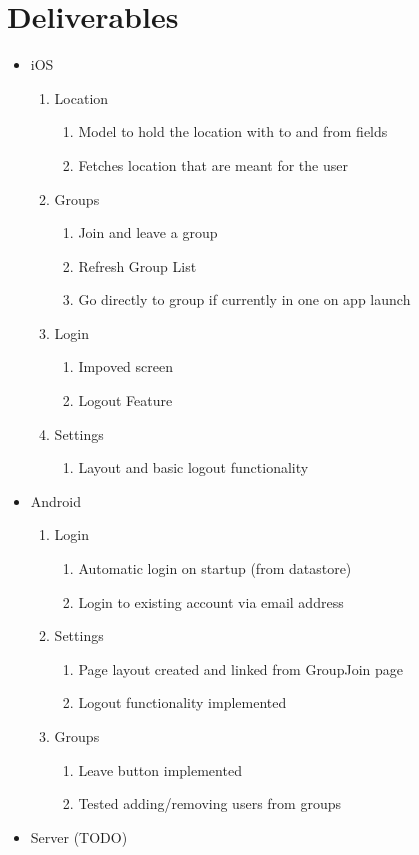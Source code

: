 \documentclass[11pt]{article}
\begin{document}
\section*{Deliverables}
	\begin{itemize}
	\item iOS
		\begin{enumerate}
		\item Location
			\begin{enumerate}
			\item Model to hold the location with to and from fields
			\item Fetches location that are meant for the user
			\end{enumerate}
		\item Groups
			\begin{enumerate}
			\item Join and leave a group
			\item Refresh Group List
			\item Go directly to group if currently in one on app launch
			\end{enumerate}
		\item Login
			\begin{enumerate}
			\item Impoved screen
			\item Logout Feature
			\end{enumerate}
		\item Settings
			\begin{enumerate}
			\item Layout and basic logout functionality
			\end{enumerate}
		\end{enumerate}
		
	\item Android
		\begin{enumerate}
		\item Login
			\begin{enumerate}
			\item Automatic login on startup (from datastore)
			\item Login to existing account via email address
			\end{enumerate}
		\item Settings
			\begin{enumerate}
			\item Page layout created and linked from GroupJoin page
			\item Logout functionality implemented
			\end{enumerate}
		\item Groups
			\begin{enumerate}
			\item Leave button implemented
			\item Tested adding/removing users from groups
			\end{enumerate}
		\end{enumerate}
	\item Server
		(TODO)


\end{itemize}
\end{document}
